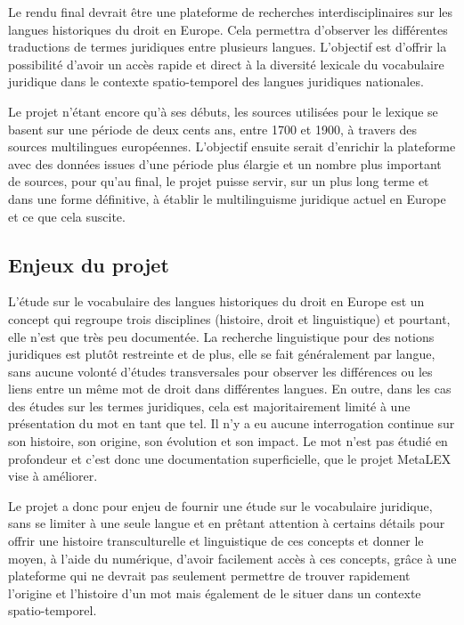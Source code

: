 Le rendu final devrait être une plateforme de recherches interdisciplinaires sur les langues historiques du droit en Europe. Cela permettra d'observer les différentes traductions de termes juridiques entre plusieurs langues. L'objectif est d'offrir la possibilité d'avoir un accès rapide et direct à la diversité lexicale du vocabulaire juridique dans le contexte spatio-temporel des langues juridiques nationales.

Le projet n'étant encore qu'à ses débuts, les sources utilisées pour le lexique se basent sur une période de deux cents ans, entre 1700 et 1900, à travers des sources multilingues européennes. L'objectif ensuite serait d'enrichir la plateforme avec des données issues d'une période plus élargie et un nombre plus important de sources, pour qu'au final, le projet puisse servir, sur un plus long terme et dans une forme définitive, à établir le multilinguisme juridique actuel en Europe et ce que cela suscite.

\subsection{Enjeux du projet}
L'étude sur le vocabulaire des langues historiques du droit en Europe est un concept qui regroupe trois disciplines (histoire, droit et linguistique) et pourtant, elle n'est que très peu documentée. La recherche linguistique pour des notions juridiques est plutôt restreinte et de plus, elle se fait généralement par langue, sans aucune volonté d'études transversales pour observer les différences ou les liens entre un même mot de droit dans différentes langues. En outre, dans les cas des études sur les termes juridiques, cela est majoritairement limité à une présentation du mot en tant que tel. Il n'y a eu aucune interrogation continue sur son histoire, son origine, son évolution et son impact. Le mot n'est pas étudié en profondeur et c'est donc une documentation superficielle, que le projet MetaLEX vise à améliorer.

Le projet a donc pour enjeu de fournir une étude sur le vocabulaire juridique, sans se limiter à une seule langue et en prêtant attention à certains détails pour offrir une histoire transculturelle et linguistique de ces concepts et donner le moyen, à l'aide du numérique, d'avoir facilement accès à ces concepts, grâce à une plateforme qui ne devrait pas seulement permettre de trouver rapidement l'origine et l'histoire d'un mot mais également de le situer dans un contexte spatio-temporel.